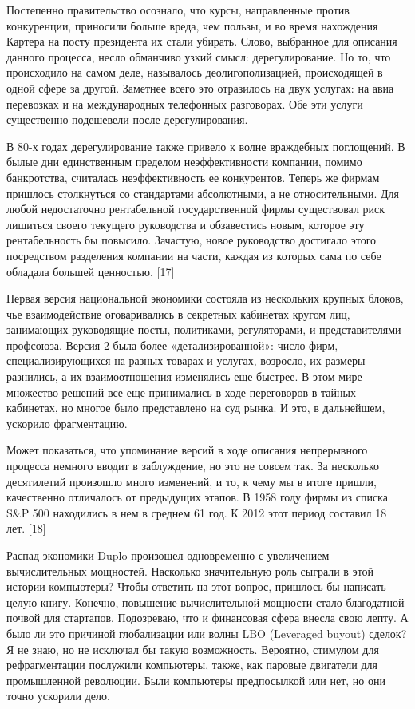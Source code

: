 \documentclass[ebook,12pt,oneside,openany]{memoir}
\begin{document}
Постепенно правительство осознало, что курсы, направленные против
конкуренции, приносили больше вреда, чем пользы, и во время нахождения
Картера на посту президента их стали убирать. Слово, выбранное для
описания данного процесса, несло обманчиво узкий смысл:
дерегулирование. Но то, что происходило на самом деле, называлось
деолигополизацией, происходящей в одной сфере за другой. Заметнее
всего это отразилось на двух услугах: на авиа перевозках и на
международных телефонных разговорах. Обе эти услуги существенно
подешевели после дерегулирования. \newline

В 80-х годах дерегулирование также привело к волне враждебных
поглощений. В былые дни единственным пределом неэффективности
компании, помимо банкротства, считалась неэффективность ее
конкурентов. Теперь же фирмам пришлось столкнуться со стандартами
абсолютными, а не относительными. Для любой недостаточно рентабельной
государственной фирмы существовал риск лишиться своего текущего
руководства и обзавестись новым, которое эту рентабельность бы
повысило. Зачастую, новое руководство достигало этого посредством
разделения компании на части, каждая из которых сама по себе обладала
большей ценностью. [17] \newline

Первая версия национальной экономики состояла из нескольких крупных
блоков, чье взаимодействие оговаривались в секретных кабинетах кругом
лиц, занимающих руководящие посты, политиками, регуляторами, и
представителями профсоюза. Версия 2 была более «детализированной»:
число фирм, специализирующихся на разных товарах и услугах, возросло,
их размеры разнились, а их взаимоотношения изменялись еще быстрее. В
этом мире множество решений все еще принимались в ходе переговоров в
тайных кабинетах, но многое было представлено на суд рынка. И это, в
дальнейшем, ускорило фрагментацию. \newline

Может показаться, что упоминание версий в ходе описания непрерывного
процесса немного вводит в заблуждение, но это не совсем так. За
несколько десятилетий произошло много изменений, и то, к чему мы в
итоге пришли, качественно отличалось от предыдущих этапов. В 1958 году
фирмы из списка S\&P 500 находились в нем в среднем 61 год. К 2012
этот период составил 18 лет. [18] \newline

Распад экономики Duplo произошел одновременно с увеличением
вычислительных мощностей. Насколько значительную роль сыграли в этой
истории компьютеры? Чтобы ответить на этот вопрос, пришлось бы
написать целую книгу. Конечно, повышение вычислительной мощности стало
благодатной почвой для стартапов. Подозреваю, что и финансовая сфера
внесла свою лепту. А было ли это причиной глобализации или волны LBO
(Leveraged buyout) сделок? Я не знаю, но не исключал бы такую
возможность. Вероятно, стимулом для рефрагментации послужили
компьютеры, также, как паровые двигатели для промышленной революции.
Были компьютеры предпосылкой или нет, но они точно ускорили дело. \newline
\end{document}
